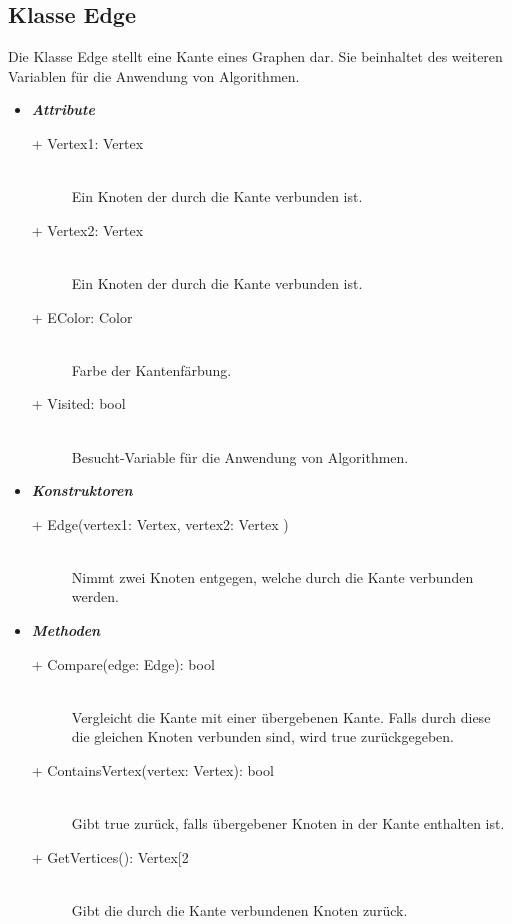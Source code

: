 \documentclass[13pt]{scrreprt}
\begin{document}
	\subsection{Klasse Edge}
	Die Klasse Edge stellt eine Kante eines Graphen dar. Sie beinhaltet des weiteren Variablen für die Anwendung von Algorithmen.
	\begin{itemize}[label = {$\circ$}]
		\item {\large \textbf{\textit{Attribute}}\par}
		\begin{description}
			\item [+ Vertex1: Vertex] \hfill \\ Ein Knoten der durch die Kante verbunden ist.
			\item [+ Vertex2: Vertex] \hfill \\ Ein Knoten der durch die Kante verbunden ist.
			\item [+ EColor: Color] \hfill \\ Farbe der Kantenfärbung.
			\item [+ Visited: bool] \hfill \\ Besucht-Variable für die Anwendung von Algorithmen.
		\end{description}
		\item {\large \textbf{\textit{Konstruktoren}}\par}
		\begin{description}
			\item [+ Edge(vertex1: Vertex, vertex2: Vertex )] \hfill \\ Nimmt zwei Knoten entgegen, welche durch die Kante verbunden werden.
		\end{description}
		\item {\large \textbf{\textit{Methoden}}\par}
		\begin{description}
			\item [+ Compare(edge: Edge): bool] \hfill \\ Vergleicht die Kante mit einer übergebenen Kante. Falls durch diese die gleichen Knoten verbunden sind, wird true zurückgegeben.
			\item [+ ContainsVertex(vertex: Vertex): bool] \hfill \\ Gibt true zurück, falls übergebener Knoten in der Kante enthalten ist.
			\item [+ GetVertices(): Vertex[2\rbrack] \hfill \\ Gibt die durch die Kante verbundenen Knoten zurück.
		\end{description}
	\end{itemize}
	
\end{document}
